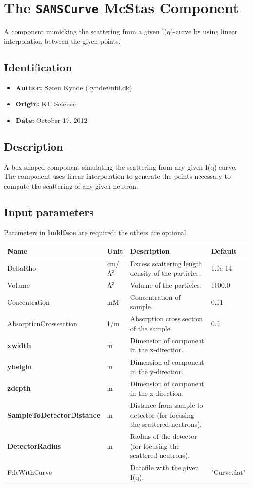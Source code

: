 \section{The \texttt{SANSCurve} McStas Component}
A component mimicking the scattering from a given I(q)-curve by using
linear interpolation between the given points.

\subsection*{Identification}
\begin{itemize}
  \item \textbf{Author:} Søren Kynde (kynde@nbi.dk)
  \item \textbf{Origin:} KU-Science
  \item \textbf{Date:} October 17, 2012
\end{itemize}

\subsection*{Description}
A box-shaped component simulating the scattering from any given I(q)-curve. The component uses linear interpolation to generate the points necessary to compute the scattering of any given neutron.

\subsection*{Input parameters}
Parameters in \textbf{boldface} are required; the others are optional.

\begin{longtable}{p{}p{}p{}p{}}
\toprule
\textbf{Name} & \textbf{Unit} & \textbf{Description} & \textbf{Default} \\
\midrule
\endhead
DeltaRho & cm/\AA{}$^{3}$ & Excess scattering length density of the particles. & 1.0e-14 \\
Volume & \AA{}$^{3}$ & Volume of the particles. & 1000.0 \\
Concentration & mM & Concentration of sample. & 0.01 \\
AbsorptionCrosssection & 1/m & Absorption cross section of the sample. & 0.0 \\
\textbf{xwidth} & m & Dimension of component in the x-direction. &  \\
\textbf{yheight} & m & Dimension of component in the y-direction. &  \\
\textbf{zdepth} & m & Dimension of component in the z-direction. &  \\
\textbf{SampleToDetectorDistance} & m & Distance from sample to detector (for focusing the scattered neutrons). &  \\
\textbf{DetectorRadius} & m & Radius of the detector (for focusing the scattered neutrons). &  \\
FileWithCurve &  & Datafile with the given I(q). & "Curve.dat" \\
\bottomrule
\end{longtable}

